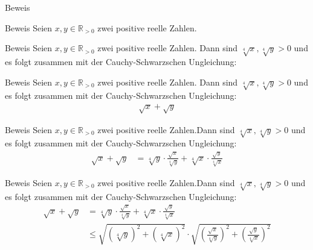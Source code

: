 \documentclass[10pt]{beamer}
\def\bR{\mathbb{R}}
\begin{document}
\begin{frame}{Beweis}
    
\end{frame}



\begin{frame}{Beweis}
    Seien \( x, y \in \bR_{> 0} \) zwei positive reelle Zahlen.
\end{frame}



\begin{frame}{Beweis}
    Seien \( x, y \in \bR_{> 0} \) zwei positive reelle Zahlen. Dann sind \( \sqrt[4]{x}, \sqrt[4]{y} > 0 \) und es folgt zusammen mit der Cauchy-Schwarzschen Ungleichung:
\end{frame}



\begin{frame}{Beweis}
    Seien \( x, y \in \bR_{> 0} \) zwei positive reelle Zahlen. Dann sind \( \sqrt[4]{x}, \sqrt[4]{y} > 0 \) und es folgt zusammen mit der Cauchy-Schwarzschen Ungleichung:
    \begin{align*}
        \sqrt{x} + \sqrt{y}
    \end{align*}
\end{frame}



\begin{frame}{Beweis}
    Seien \( x, y \in \bR_{> 0} \) zwei positive reelle Zahlen.Dann sind \( \sqrt[4]{x}, \sqrt[4]{y} > 0 \) und es folgt zusammen mit der Cauchy-Schwarzschen Ungleichung:
    \begin{align*}
        \sqrt{x} + \sqrt{y}
        & = \sqrt[4]{y} \cdot \frac{\sqrt{x}}{\sqrt[4]{y}} + \sqrt[4]{x} \cdot \frac{\sqrt{y}}{\sqrt[4]{x}}
    \end{align*}
\end{frame}



\begin{frame}{Beweis}
    Seien \( x, y \in \bR_{> 0} \) zwei positive reelle Zahlen.Dann sind \( \sqrt[4]{x}, \sqrt[4]{y} > 0 \) und es folgt zusammen mit der Cauchy-Schwarzschen Ungleichung:
    \begin{align*}
        \sqrt{x} + \sqrt{y}
        & = \sqrt[4]{y} \cdot \frac{\sqrt{x}}{\sqrt[4]{y}} + \sqrt[4]{x} \cdot \frac{\sqrt{y}}{\sqrt[4]{x}} \\
        & \leq \sqrt{\left( \sqrt[4]{y} \right)^{2} + \left( \sqrt[4]{x} \right)^{2}} \cdot \sqrt{\left( \frac{\sqrt{x}}{\sqrt[4]{y}} \right)^{2} + \left( \frac{\sqrt{y}}{\sqrt[4]{x}} \right)^{2}}
    \end{align*}
\end{frame}
\end{document}

